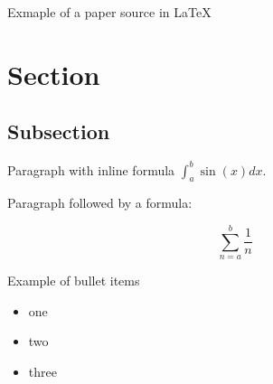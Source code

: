 

Exmaple of a paper source in LaTeX

\section{Section}

\subsection{Subsection}

Paragraph with inline formula $\int _a ^b \sin(x) dx$.

Paragraph followed by a formula:

\begin{equation}
\sum_{n=a}^b \frac{1}{n}
\end{equation}

Example of bullet items

\begin{itemize}
\item one
\item two
\item three
\end{itemize}


